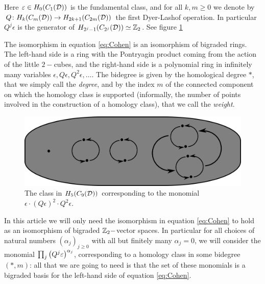 Here $\varepsilon\in H_0(C_1(\mathcal{D}))$ is the fundamental class, and for all
$k,m\geq 0$ we denote by $Q\colon H_k(C_m(\mathcal{D}))\to H_{2k+1}(C_{2m}(\mathcal{D}))$
the first Dyer-Lashof operation. In particular $Q^j\epsilon$ is the generator of
$H_{2^j-1}(C_{2^j}(\mathcal{D}))\simeq\mathbb{Z}_2$. See figure \ref{fig:monomial}

The isomorphism in equation \ref{eq:Cohen} is
an isomorphism of bigraded rings. The left-hand side is a ring with the Pontryagin product
coming from the action of the little $2-$cubes,
and the right-hand side is a polynomial ring in infinitely many variables $\epsilon,Q\epsilon,Q^2\epsilon,\dots$.
The bidegree is given by the homological degree
$*$, that we simply call the \emph{degree},
and by the index $m$ of the connected component
on which the homology class is supported (informally, the number of points
involved in the construction of a homology class), that we call the \emph{weight}.

 \begin{figure}\centering
 \includegraphics[scale=0.7]{figures/monomial.png}
 \caption{The class in $H_5(C_9(\mathcal{D}))$ corresponding to the monomial $\epsilon\cdot(Q\epsilon)^2\cdot Q^2\epsilon$.}
\label{fig:monomial}
\end{figure}

In this article we will only need the isomorphism in equation \ref{eq:Cohen} to hold as
an isomorphism of bigraded $\mathbb{Z}_2-$vector spaces.
In particular for all choices of natural numbers $(\alpha_j)_{j\geq 0}$ with all but finitely
many $\alpha_j=0$, we will consider the monomial $\prod_j\left(Q^j\varepsilon\right)^{\alpha_j}$, corresponding to
a homology class in some bidegree $(*,m)$: all that
we are going to need is that the set of these monomials is a bigraded basis for the
left-hand side of equation \ref{eq:Cohen}.